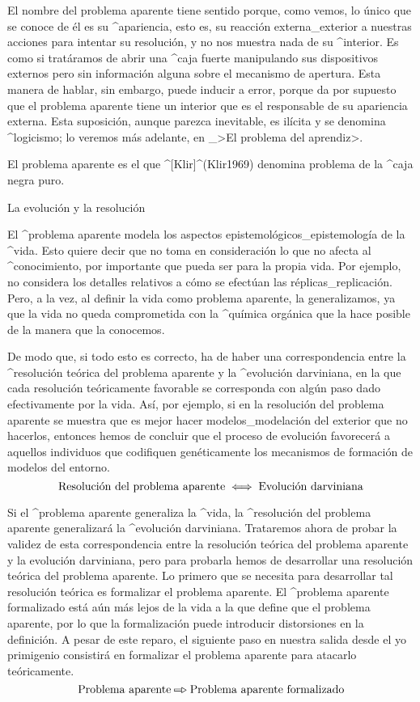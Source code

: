 El nombre del problema aparente tiene sentido porque, como vemos, lo
único que se conoce de él es su ^{apariencia}, esto es, su reacción
externa_{exterior} a nuestras acciones para intentar su resolución, y no
nos muestra nada de su ^{interior}. Es como si tratáramos de abrir una
^{caja fuerte} manipulando sus dispositivos externos pero sin
información alguna sobre el mecanismo de apertura. Esta manera de
hablar, sin embargo, puede inducir a error, porque da por supuesto que
el problema aparente tiene un interior que es el responsable de su
apariencia externa. Esta suposición, aunque parezca inevitable, es
ilícita y se denomina ^{logicismo}; lo veremos más adelante, en
_>El problema del aprendiz>.

El problema aparente es el que ^[Klir]^(Klir1969) denomina problema de
la ^{caja negra} puro.


\Section La evolución y la resolución

El ^{problema aparente} modela los aspectos
epistemológicos_{epistemología} de la ^{vida}. Esto quiere decir que no
toma en consideración lo que no afecta al ^{conocimiento}, por
importante que pueda ser para la propia vida. Por ejemplo, no considera
los detalles relativos a cómo se efectúan las réplicas_{replicación}.
Pero, a la vez, al definir la vida como problema aparente, la
generalizamos, ya que la vida no queda comprometida con la ^{química
orgánica} que la hace posible de la manera que la conocemos.

De modo que, si todo esto es correcto, ha de haber una correspondencia
entre la ^{resolución} teórica del problema aparente y la ^{evolución}
darviniana, en la que cada resolución teóricamente favorable se
corresponda con algún paso dado efectivamente por la vida. Así, por
ejemplo, si en la resolución del problema aparente se muestra que es
mejor hacer modelos_{modelación} del exterior que no hacerlos, entonces
hemos de concluir que el proceso de evolución favorecerá a aquellos
individuos que codifiquen genéticamente los mecanismos de formación de
modelos del entorno.
$$\hbox{Resolución del problema aparente} \iff
  \hbox{Evolución darviniana}$$

Si el ^{problema aparente} generaliza la ^{vida}, la ^{resolución} del
problema aparente generalizará la ^{evolución} darviniana. Trataremos
ahora de probar la validez de esta correspondencia entre la resolución
teórica del problema aparente y la evolución darviniana, pero para
probarla hemos de desarrollar una resolución teórica del problema
aparente. Lo primero que se necesita para desarrollar tal resolución
teórica es formalizar el problema aparente. El ^{problema aparente
formalizado} está aún más lejos de la vida a la que define que el
problema aparente, por lo que la formalización puede introducir
distorsiones en la definición. A pesar de este reparo, el siguiente paso
en nuestra salida desde el yo primigenio consistirá en formalizar el
problema aparente para atacarlo teóricamente.
$$\hbox{Problema aparente} \etapa
 \hbox{Problema aparente formalizado}$$

